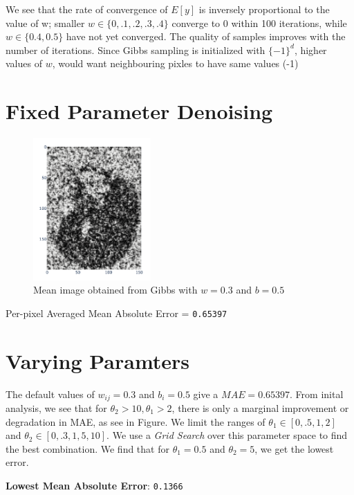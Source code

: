 \documentclass[11pt]{article}
\begin{document}
We see that the rate of convergence of $E[y]$ is inversely proportional to the value of w; smaller $w \in \{ 0, .1, .2, .3, .4 \}$ converge to 0 within 100 iterations, while $w \in \{ 0.4, 0.5 \}$ have not yet converged. The quality of samples improves with the number of iterations. Since Gibbs sampling is initialized with $\{-1\}^d$, higher values of $w$, would want neighbouring pixles to have same values (-1)

\section{Fixed Parameter Denoising}

\begin{figure}[H]
    \centering
    \includegraphics[width=0.4\textwidth]{./images/default-img-noisy.png}
    \caption{Mean image obtained from Gibbs with $w = 0.3$ and $b = 0.5$ }
\end{figure}

Per-pixel Averaged Mean Absolute Error = \texttt{0.65397}


\section{Varying Paramters}

The default values of $w_{ij} = 0.3$ and $b_i = 0.5$ give a $MAE = 0.65397$. From inital analysis, we see that for $\theta_2 > 10, \theta_1 > 2$, there is only a marginal improvement or degradation in MAE, as see in Figure. We limit the ranges of $\theta_1 \in [0, .5, 1, 2]$ and $\theta_2 \in [0, .3, 1, 5, 10]$.
We use a \textit{Grid Search} over this parameter space to find the best combination. We find that for $\theta_1 = 0.5$ and $\theta_2 = 5$, we get the lowest error. 

\noindent \textbf{Lowest Mean Absolute Error}: \texttt{0.1366}
\end{document}
